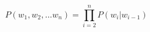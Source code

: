 \begin{equation}
P(w_{1},w_{2}, ... w_{n})= \prod_{i=2}^{n}P(w_{i} | w_{i-1})
\label{eq:bigram_lm} 
\end{equation}